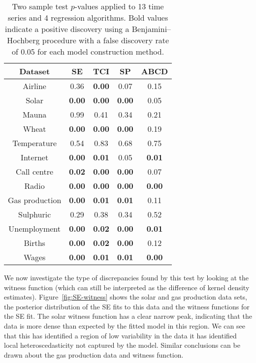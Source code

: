 \begin{table}[ht]
\center
\begin{tabular}{|c|c|c|c|c|}
\hline
Dataset & SE & TCI & SP & ABCD \\
\hline
Airline        & 0.36 & \bf{0.00} & 0.07 & 0.15 \\
Solar          & \bf{0.00} & \bf{0.00} & \bf{0.00} & 0.05 \\
Mauna          & 0.99 & 0.41 & 0.34 & 0.21 \\
Wheat          & \bf{0.00} & \bf{0.00} & \bf{0.00} & 0.19 \\
Temperature    & 0.54 & 0.83 & 0.68 & 0.75 \\
Internet       & \bf{0.00} & \bf{0.01} & 0.05 & \bf{0.01} \\
Call centre    & \bf{0.02} & \bf{0.00} & \bf{0.00} & 0.07 \\
Radio          & \bf{0.00} & \bf{0.00} & \bf{0.00} & \bf{0.00} \\
Gas production & \bf{0.00} & \bf{0.01} & \bf{0.01} & 0.11 \\
Sulphuric      & 0.29 & 0.38 & 0.34 & 0.52 \\
Unemployment   & \bf{0.00} & \bf{0.02} & \bf{0.00} & \bf{0.01} \\
Births         & \bf{0.00} & \bf{0.02} & \bf{0.00} & 0.12 \\
Wages          & \bf{0.00} & \bf{0.01} & \bf{0.01} & \bf{0.00} \\
\hline
\end{tabular}
\caption[Two sample test $p$-values applied to 13 time series and 4 regression algorithms.]{Two sample test $p$-values applied to 13 time series and 4 regression algorithms.
Bold values indicate a positive discovery using a Benjamini--Hochberg procedure with a false discovery rate of 0.05 for each model construction method.}
\label{table:ABCD-p-values}
\end{table}

We now investigate the type of discrepancies found by this test by looking at the witness function (which can still be interpreted as the difference of kernel density estimates).
Figure~\ref{fig:SE-witness} shows the solar and gas production data sets, the posterior distribution of the SE fits to this data and the witness functions for the SE fit.
The solar witness function has a clear narrow peak, indicating that the data is more dense than expected by the fitted model in this region.
We can see that this has identified a region of low variability in the data \ie it has identified local heteroscedasticity not captured by the model.
Similar conclusions can be drawn about the gas production data and witness function.

